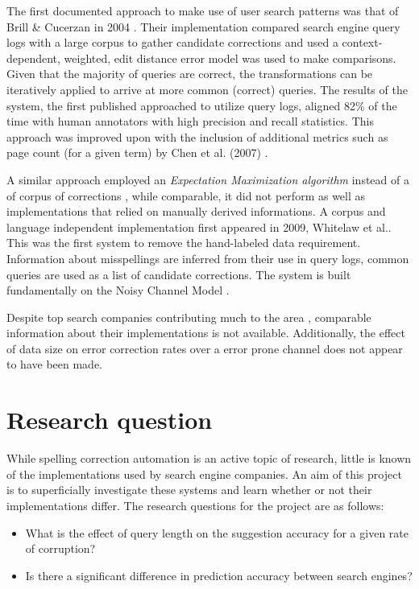 \documentclass{csfourzero}
\begin{document}
The first documented approach to make use of user search patterns was that of Brill \& Cucerzan in 2004 \cite{webuserpoweredspelling}. Their implementation compared search engine query logs  with a large corpus to gather candidate corrections and used a context-dependent, weighted, edit distance error model was used to make comparisons. Given that the majority of queries are correct, the transformations can be iteratively applied to arrive at more common (correct) queries. The results of the system, the first published approached to utilize query logs, aligned 82\% of the time with human annotators with high precision and recall statistics. This approach was improved upon with the inclusion of additional metrics such as page count (for a given term) by Chen et al. (2007) \cite{webuser3}.

A similar approach employed an \textit{Expectation Maximization algorithm} instead of a of corpus of corrections \cite{webuser2learningerrormodel}, while comparable, it did not perform as well as implementations that relied on manually derived informations. A corpus and language independent implementation first appeared in 2009, Whitelaw et al.\cite{webuser4google2009}. This was the first system to remove the hand-labeled data requirement. Information about misspellings are inferred from their use in query logs, common queries are used as a list of candidate corrections. The system is built fundamentally on the Noisy Channel Model \cite{claudeshannon1948}.

Despite top search companies contributing much to the area \cite{microranker, webuser3, webuserpoweredspelling, microranker, microphone, webuser4google2009}, comparable information about their implementations is not available. Additionally, the effect of data size on error correction rates over a error prone channel does not appear to have been made.

\section{Research question}
\label{sec:rq}

While spelling correction automation is an active topic of research, little is known of the implementations used by search engine companies. An aim of this project is to superficially investigate these systems and learn whether or not their implementations differ. The research questions for the project are as follows:

\begin{itemize}
  \item{What is the effect of query length on the suggestion accuracy for a given rate of corruption?}
  \item{Is there a significant difference in prediction accuracy between search engines?}
\end{itemize}
\end{document}
